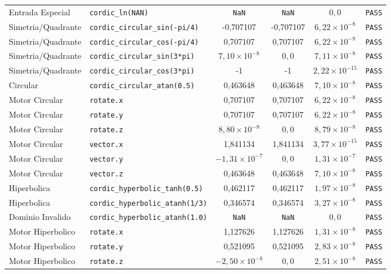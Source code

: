 \begin{table}[htbp]
{\begin{tabular}{llcccc}
Entrada Especial & \texttt{cordic\_ln(NAN)} & \texttt{NaN} & \texttt{NaN} & $0{,}0$ & \texttt{PASS} \\
Simetria/Quadrante & \texttt{cordic\_circular\_sin(-pi/4)} & -0,707107 & -0,707107 & $6,22 \times 10^{-8}$ & \texttt{PASS} \\
Simetria/Quadrante & \texttt{cordic\_circular\_cos(-pi/4)} & 0,707107 & 0,707107 & $6,22 \times 10^{-8}$ & \texttt{PASS} \\
Simetria/Quadrante & \texttt{cordic\_circular\_sin(3*pi)} & $7,10 \times 10^{-8}$ & $0{,}0$ & $7,11 \times 10^{-8}$ & \texttt{PASS} \\
Simetria/Quadrante & \texttt{cordic\_circular\_cos(3*pi)} & -1 & -1 & $2,22 \times 10^{-15}$ & \texttt{PASS} \\
Circular & \texttt{cordic\_circular\_atan(0.5)} & 0,463648 & 0,463648 & $7,10 \times 10^{-8}$ & \texttt{PASS} \\
Motor Circular & \texttt{rotate.x} & 0,707107 & 0,707107 & $6,22 \times 10^{-8}$ & \texttt{PASS} \\
Motor Circular & \texttt{rotate.y} & 0,707107 & 0,707107 & $6,22 \times 10^{-8}$ & \texttt{PASS} \\
Motor Circular & \texttt{rotate.z} & $8,80 \times 10^{-8}$ & $0{,}0$ & $8,79 \times 10^{-8}$ & \texttt{PASS} \\
Motor Circular & \texttt{vector.x} & 1,841134 & 1,841134 & $3,77 \times 10^{-15}$ & \texttt{PASS} \\
Motor Circular & \texttt{vector.y} & $-1,31 \times 10^{-7}$ & $0{,}0$ & $1,31 \times 10^{-7}$ & \texttt{PASS} \\
Motor Circular & \texttt{vector.z} & 0,463648 & 0,463648 & $7,10 \times 10^{-8}$ & \texttt{PASS} \\
Hiperbolica & \texttt{cordic\_hyperbolic\_tanh(0.5)} & 0,462117 & 0,462117 & $1,97 \times 10^{-8}$ & \texttt{PASS} \\
Hiperbolica & \texttt{cordic\_hyperbolic\_atanh(1/3)} & 0,346574 & 0,346574 & $3,27 \times 10^{-8}$ & \texttt{PASS} \\
Dominio Invalido & \texttt{cordic\_hyperbolic\_atanh(1.0)} & \texttt{NaN} & \texttt{NaN} & $0{,}0$ & \texttt{PASS} \\
Motor Hiperbolico & \texttt{rotate.x} & 1,127626 & 1,127626 & $1,31 \times 10^{-8}$ & \texttt{PASS} \\
Motor Hiperbolico & \texttt{rotate.y} & 0,521095 & 0,521095 & $2,83 \times 10^{-8}$ & \texttt{PASS} \\
Motor Hiperbolico & \texttt{rotate.z} & $-2,50 \times 10^{-8}$ & $0{,}0$ & $2,51 \times 10^{-8}$ & \texttt{PASS} \\

\end{tabular}}
\end{table}
